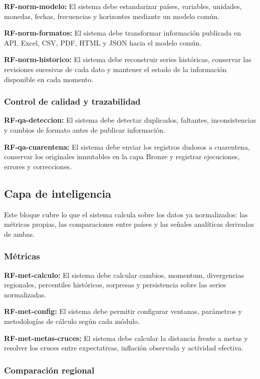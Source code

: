 \documentclass[11pt,a4paper]{article}
\newcommand{\rf}[2]{%
  \noindent
  \textbf{RF-#1:} #2
  \par\smallskip
}
\begin{document}
\rf{norm-modelo}{El sistema debe estandarizar pa\'ises, variables, unidades,
monedas, fechas, frecuencias y horizontes mediante un modelo com\'un.}

\rf{norm-formatos}{El sistema debe transformar informaci\'on publicada en API,
Excel, CSV, PDF, HTML y JSON hacia el modelo com\'un.}

\rf{norm-historico}{El sistema debe reconstruir series hist\'oricas, conservar
las revisiones sucesivas de cada dato y mantener el estado de la informaci\'on
disponible en cada momento.}

\subsubsection{Control de calidad y trazabilidad}

\rf{qa-deteccion}{El sistema debe detectar duplicados, faltantes,
inconsistencias y cambios de formato antes de publicar informaci\'on.}

\rf{qa-cuarentena}{El sistema debe enviar los registros dudosos a cuarentena,
conservar los originales inmutables en la capa Bronze y registrar ejecuciones,
errores y correcciones.}

\subsection{Capa de inteligencia}

Este bloque cubre lo que el sistema calcula sobre los datos ya normalizados: las
métricas propias, las comparaciones entre países y las señales analíticas
derivadas de ambas.

\subsubsection{Métricas}

\rf{met-calculo}{El sistema debe calcular cambios, momentum, divergencias
regionales, percentiles hist\'oricos, sorpresas y persistencia sobre las series
normalizadas.}

\rf{met-config}{El sistema debe permitir configurar ventanas, par\'ametros y
metodolog\'ias de c\'alculo seg\'un cada m\'odulo.}

\rf{met-metas-cruces}{El sistema debe calcular la distancia frente a metas y
resolver los cruces entre expectativas, inflaci\'on observada y actividad
efectiva.}

\subsubsection{Comparación regional}
\end{document}
